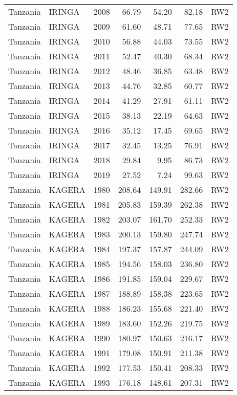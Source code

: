 \begin{longtable}{lllrrrl}
  Tanzania & IRINGA & 2008 & 66.79 & 54.20 & 82.18 & RW2 \\ 
  Tanzania & IRINGA & 2009 & 61.60 & 48.71 & 77.65 & RW2 \\ 
  Tanzania & IRINGA & 2010 & 56.88 & 44.03 & 73.55 & RW2 \\ 
  Tanzania & IRINGA & 2011 & 52.47 & 40.30 & 68.34 & RW2 \\ 
  Tanzania & IRINGA & 2012 & 48.46 & 36.85 & 63.48 & RW2 \\ 
  Tanzania & IRINGA & 2013 & 44.76 & 32.85 & 60.77 & RW2 \\ 
  Tanzania & IRINGA & 2014 & 41.29 & 27.91 & 61.11 & RW2 \\ 
  Tanzania & IRINGA & 2015 & 38.13 & 22.19 & 64.63 & RW2 \\ 
  Tanzania & IRINGA & 2016 & 35.12 & 17.45 & 69.65 & RW2 \\ 
  Tanzania & IRINGA & 2017 & 32.45 & 13.25 & 76.91 & RW2 \\ 
  Tanzania & IRINGA & 2018 & 29.84 & 9.95 & 86.73 & RW2 \\ 
  Tanzania & IRINGA & 2019 & 27.52 & 7.24 & 99.63 & RW2 \\ 
  Tanzania & KAGERA & 1980 & 208.64 & 149.91 & 282.66 & RW2 \\ 
  Tanzania & KAGERA & 1981 & 205.83 & 159.39 & 262.38 & RW2 \\ 
  Tanzania & KAGERA & 1982 & 203.07 & 161.70 & 252.33 & RW2 \\ 
  Tanzania & KAGERA & 1983 & 200.13 & 159.80 & 247.74 & RW2 \\ 
  Tanzania & KAGERA & 1984 & 197.37 & 157.87 & 244.09 & RW2 \\ 
  Tanzania & KAGERA & 1985 & 194.56 & 158.03 & 236.80 & RW2 \\ 
  Tanzania & KAGERA & 1986 & 191.85 & 159.04 & 229.67 & RW2 \\ 
  Tanzania & KAGERA & 1987 & 188.89 & 158.38 & 223.65 & RW2 \\ 
  Tanzania & KAGERA & 1988 & 186.23 & 155.68 & 221.40 & RW2 \\ 
  Tanzania & KAGERA & 1989 & 183.60 & 152.26 & 219.75 & RW2 \\ 
  Tanzania & KAGERA & 1990 & 180.97 & 150.63 & 216.17 & RW2 \\ 
  Tanzania & KAGERA & 1991 & 179.08 & 150.91 & 211.38 & RW2 \\ 
  Tanzania & KAGERA & 1992 & 177.53 & 150.41 & 208.33 & RW2 \\ 
  Tanzania & KAGERA & 1993 & 176.18 & 148.61 & 207.31 & RW2 \\ 

\end{longtable}
